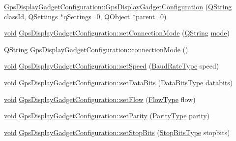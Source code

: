 \begin{DoxyCompactItemize}
\item 
\hyperlink{group___g_p_s_gadget_plugin_ga9ce38cb5c86c5783c8b96457d926f9c4}{Gps\-Display\-Gadget\-Configuration\-::\-Gps\-Display\-Gadget\-Configuration} (\hyperlink{group___u_a_v_objects_plugin_gab9d252f49c333c94a72f97ce3105a32d}{Q\-String} class\-Id, Q\-Settings $\ast$q\-Settings=0, Q\-Object $\ast$parent=0)
\item 
\hyperlink{group___u_a_v_objects_plugin_ga444cf2ff3f0ecbe028adce838d373f5c}{void} \hyperlink{group___g_p_s_gadget_plugin_ga0025e5ae0ab4f8a16c2b69a4aef3a8be}{Gps\-Display\-Gadget\-Configuration\-::set\-Connection\-Mode} (\hyperlink{group___u_a_v_objects_plugin_gab9d252f49c333c94a72f97ce3105a32d}{Q\-String} \hyperlink{glext_8h_a1e71d9c196e4683cc06c4b54d53f7ef5}{mode})
\item 
\hyperlink{group___u_a_v_objects_plugin_gab9d252f49c333c94a72f97ce3105a32d}{Q\-String} \hyperlink{group___g_p_s_gadget_plugin_ga77783cad102ac5a0338e0fe296402b23}{Gps\-Display\-Gadget\-Configuration\-::connection\-Mode} ()
\item 
\hyperlink{group___u_a_v_objects_plugin_ga444cf2ff3f0ecbe028adce838d373f5c}{void} \hyperlink{group___g_p_s_gadget_plugin_gaf15cd0543ca6d85d3593905f8e8b7301}{Gps\-Display\-Gadget\-Configuration\-::set\-Speed} (\hyperlink{qextserialport_8h_a6f031169a6a9b150b5af707bb23cf010}{Baud\-Rate\-Type} speed)
\item 
\hyperlink{group___u_a_v_objects_plugin_ga444cf2ff3f0ecbe028adce838d373f5c}{void} \hyperlink{group___g_p_s_gadget_plugin_ga30b358e2d5b28de7d18749cfb6dbf9cb}{Gps\-Display\-Gadget\-Configuration\-::set\-Data\-Bits} (\hyperlink{qextserialport_8h_a189ef78c2c1b7537ab114d576f6214fa}{Data\-Bits\-Type} databits)
\item 
\hyperlink{group___u_a_v_objects_plugin_ga444cf2ff3f0ecbe028adce838d373f5c}{void} \hyperlink{group___g_p_s_gadget_plugin_ga56ec26969426f55eb39373779ba78ddb}{Gps\-Display\-Gadget\-Configuration\-::set\-Flow} (\hyperlink{qextserialport_8h_a02ad1c7cf791a069dd54e409f8db4790}{Flow\-Type} flow)
\item 
\hyperlink{group___u_a_v_objects_plugin_ga444cf2ff3f0ecbe028adce838d373f5c}{void} \hyperlink{group___g_p_s_gadget_plugin_gaea8c500878652f4b518a990e0f6ee05a}{Gps\-Display\-Gadget\-Configuration\-::set\-Parity} (\hyperlink{qextserialport_8h_aee22d32d87c815090354bf9b8e957ace}{Parity\-Type} parity)
\item 
\hyperlink{group___u_a_v_objects_plugin_ga444cf2ff3f0ecbe028adce838d373f5c}{void} \hyperlink{group___g_p_s_gadget_plugin_gae002581f291f9efae24ad5163c654909}{Gps\-Display\-Gadget\-Configuration\-::set\-Stop\-Bits} (\hyperlink{qextserialport_8h_adc8078895cd941d755d46633b54d3e7f}{Stop\-Bits\-Type} stopbits)

\end{DoxyCompactItemize}
